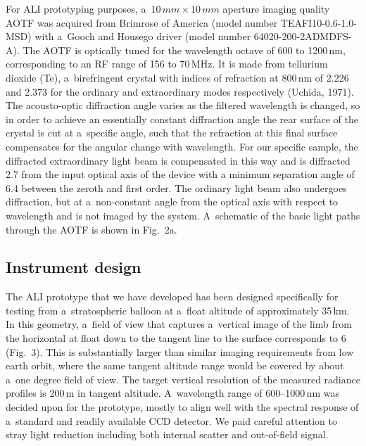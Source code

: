 \documentclass[amtd, online, hvmath]{copernicus}
\begin{document}
For ALI prototyping purposes, a~$10\,\unit{mm} \times 10\,\unit{mm}$
aperture imaging quality AOTF was acquired from Brimrose of America
(model number TEAFI10-0.6-1.0-MSD) with a~Gooch and Housego driver
(model number 64020-200-2ADMDFS-A). The AOTF is optically tuned for
the wavelength octave of 600 to 1200\,\unit{nm}, corresponding to an
RF range of 156 to 70\,\unit{MHz}. It is made from tellurium dioxide
(Te), a~birefringent crystal with indices of refraction at
800\,\unit{nm} of 2.226 and 2.373 for the ordinary and extraordinary
modes respectively (Uchida, 1971). The acousto-optic diffraction angle varies as the filtered wavelength is changed, so in order to achieve an
essentially constant diffraction angle the rear surface of the crystal
is cut at a~specific angle, such that the refraction at this final
surface compensates for the angular change with wavelength. For our
specific sample, the diffracted extraordinary light beam is
compensated in this way and is diffracted 2.7{\degree} from the
input optical axis of the device with a minimum separation angle of 6.4{\degree} between the zeroth and first order. The ordinary light beam also
undergoes diffraction, but at a~non-constant angle from the optical
axis with respect to wavelength and is not imaged by the
system. A~schematic of the basic light paths through the AOTF is shown
in Fig.~2a.

\subsection{Instrument design}

The ALI prototype that we have developed has been designed
specifically for testing from a~stratospheric balloon at a~float
altitude of approximately 35\,\unit{km}. In this geometry, a~field of
view that captures a~vertical image of the limb from the horizontal at
float down to the tangent line to the surface corresponds to
6{\degree} (Fig.~3). This is substantially larger than similar imaging
requirements from low earth orbit, where the same tangent altitude
range would be covered by about a~one degree field of view. The target
vertical resolution of the measured radiance profiles is 200\,\unit{m}
in tangent altitude. A~wavelength range of 600--1000\,\unit{nm} was
decided upon for the prototype, mostly to align well with the spectral
response of a~standard and readily available CCD detector. We paid careful attention to stray light reduction including
both internal scatter and out-of-field signal.
\end{document}
